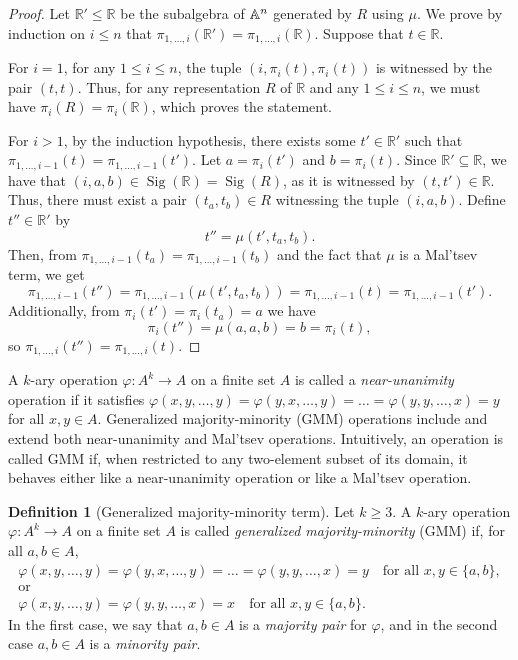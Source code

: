 \documentclass{article}
\newcommand{\A}{\ensuremath\mathbb{A}}
\newcommand{\R}{\mathbb{R}}
\theoremstyle{definition}
\newtheorem{df}{Definition}
\theoremstyle{theorem}
\theoremstyle{theorem}
\theoremstyle{remark}
\theoremstyle{remark}
\theoremstyle{example}
\theoremstyle{notation}
\theoremstyle{theorem}
\begin{document}
\begin{proof}
Let $\mathbb{R}' \leq \R$ be the subalgebra of $\A^n$ generated by $R$ using $\mu$. We prove by induction on $i\leq n$ that $\pi_{1,\ldots,i}(\R') = \pi_{1,\ldots,i}(\R)$. Suppose that $t \in \R$.

For $i=1$, for any $1 \leq i \leq n$, the tuple $(i, \pi_i(t), \pi_i(t))$ is witnessed by the pair $(t, t)$. Thus, for any representation $R$ of $\R$ and any $1 \leq i \leq n$, we must have $\pi_i(R) = \pi_i(\R)$, which proves the statement.

For $i>1$, by the induction hypothesis, there exists some $t' \in \R'$ such that $\pi_{1,\ldots,i-1}(t) = \pi_{1,\ldots,i-1}(t')$. Let $a = \pi_i(t')$ and $b = \pi_i(t)$. Since $\R' \subseteq \R$, we have that $(i, a, b) \in \operatorname{Sig}(\R) = \operatorname{Sig}(R)$, as it is witnessed by $(t, t') \in \R$. Thus, there must exist a pair $(t_a, t_b) \in R$ witnessing the tuple $(i, a, b)$. Define $t'' \in \R'$ by
$$
t'' = \mu(t', t_a, t_b).
$$
Then, from $\pi_{1,\ldots,i-1}(t_a) = \pi_{1,\ldots,i-1}(t_b)$ and the fact that $\mu$ is a Mal'tsev term, we get
$$
\pi_{1,\ldots,i-1}(t'') = \pi_{1,\ldots,i-1}(\mu(t', t_a, t_b)) = \pi_{1,\ldots,i-1}(t) = \pi_{1,\ldots,i-1}(t').
$$
Additionally, from $\pi_i(t') = \pi_i(t_a) = a$ we have
$$
\pi_i(t'') = \mu(a, a, b) = b = \pi_i(t),
$$
so $\pi_{1,\ldots,i}(t'') = \pi_{1,\ldots,i}(t)$.
\end{proof}


A $k$-ary operation $\varphi: A^k \to A$ on a finite set $A$ is called a \emph{near-unanimity} operation if it satisfies $\varphi(x, y, \ldots, y) = \varphi(y, x, \ldots, y) = \ldots = \varphi(y, y, \ldots, x) = y$ for all $x, y \in A$. Generalized majority-minority (GMM) operations include and extend both near-unanimity and Mal'tsev operations. Intuitively, an operation is called GMM if, when restricted to any two-element subset of its domain, it behaves either like a near-unanimity operation or like a Mal'tsev operation.

\begin{df}[Generalized majority-minority term]
Let $k \geq 3$. A $k$-ary operation $\varphi: A^k \to A$ on a finite set $A$ is called \emph{generalized majority-minority} (GMM) if, for all $a,b \in A$,
\begin{gather*}
    \varphi(x, y, \ldots, y) = \varphi(y, x, \ldots, y) = \ldots = \varphi(y, y, \ldots, x) = y \quad \text{for all } x, y \in \{a, b\}, \\
    \text{or} \\
    \varphi(x, y, \ldots, y) = \varphi(y, y, \ldots, x) = x \quad \text{for all } x, y \in \{a, b\}.
\end{gather*}
In the first case, we say that $a, b\in A$ is a \emph{majority pair} for $\varphi$, and in the second case $a, b\in A$ is a \emph{minority pair}.
\end{df}
\end{document}
